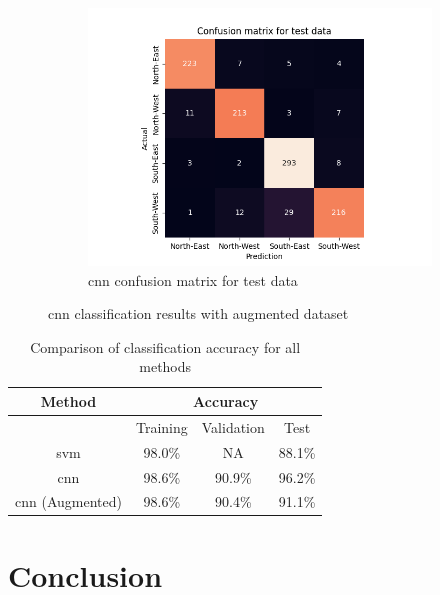\documentclass[10pt,twocolumn,letterpaper]{article}
\begin{document}
\begin{figure}
\begin{subfigure}{0.33\linewidth}
    \includegraphics[width=\linewidth, trim={7em, 0em, 9em, 5em}, clip]{cnn_aug_cfsn_test}
    \caption{\acrshort{cnn} confusion matrix for test data}
    \label{fig:cnn_test}
  \end{subfigure}
  \caption{\acrlong{cnn} classification results with augmented dataset}
  \label{fig:cnn_aug_res}
\end{figure}

\begin{table}[H]
  \centering
  \begin{tabular}{*4c}
    \toprule
    Method & \multicolumn{3}{c}{Accuracy} \\
    \midrule
    {} & Training & Validation & Test \\
    \acrshort{svm} & 98.0\% & NA & 88.1\% \\
    \acrshort{cnn} & 98.6\% & 90.9\% & 96.2\% \\
    \acrshort{cnn} (Augmented) & 98.6\% & 90.4\% & 91.1\% \\
    \bottomrule
  \end{tabular}
  \caption{Comparison of classification accuracy for all methods}
  \label{tab:accuracy}
\end{table}



\section{Conclusion}
\label{sec:conclusion}


{\small


}
\end{document}
